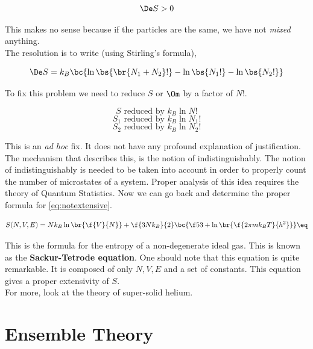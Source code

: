 \documentclass{article}
\begin{document}
\[ \De S > 0 \]

This makes no sense because if the particles are the same, we have not \textit{mixed} anything. \\

The resolution is to write (using Stirling's formula),

\[ \De S = k_B \bc{\ln \bs{\br{N_1 + N_2}!} - \ln \bs{N_1!} - \ln \bs{N_2!}} \]

To fix this problem we need to reduce $S$ or $\Om$ by a factor of $N!$.

\[ S \text{ reduced by } k_B \ln N!\]
\[ S_1 \text{ reduced by } k_B \ln N_1!\]
\[ S_2 \text{ reduced by } k_B \ln N_2!\]

This is an \textit{ad hoc} fix. It does not have any profound explanation of justification. The mechanism that describes this, is the notion of indistinguishably. The notion of indistinguishably is needed to be taken into account in order to properly count the number of microstates of a system. Proper analysis of this idea requires the theory of Quantum Statistics. Now we can go back and determine the proper formula for \eqref{eq:notextensive}.

\[ S(N,V,E) = N k_B \ln\br{\f{V}{N}} + \f{3Nk_B}{2} \bc{\f53 + \ln\br{\f{2 \pi m k_B T}{h^2}}} \eq \label{eq:sackurtetrode}\]

This is the formula for the entropy of a non-degenerate ideal gas. This is known as the \textbf{Sackur-Tetrode equation}. One should note that this equation is quite remarkable. It is composed of only $N, V, E$ and a set of constants. This equation gives a proper extensivity of $S$. \\

For more, look at the theory of super-solid helium.

\section{Ensemble Theory}
\end{document}
